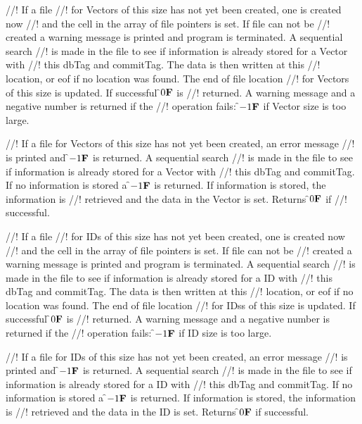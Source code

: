 //! If a file
//! for Vectors of this size has not yet been created, one is created now
//! and the cell in the array of file pointers is set. If file can not be
//! created a warning message is printed and program is terminated. A sequential search
//! is made in the file to see if information is already stored for a Vector with
//! this \p dbTag and \p commitTag. The data is then written at this
//! location, or eof if no location was found. The end of file location
//! for Vectors of this size is updated. If successful \f$0{\bf F}$ is
//! returned. A warning message and a negative number is returned if the
//! operation fails: \f$-1{\bf F}$ if Vector size is too large.

//! If a file for Vectors of this size has not yet been created, an error message
//! is printed and \f$-1{\bf F}$ is returned.  A sequential search
//! is made in the file to see if information is already stored for a Vector with
//! this \p dbTag and \p commitTag. If no information is stored a
\f$-1{\bf F}$ is returned. If information is stored, the information is
//! retrieved and the data in the Vector is set. Returns \f$0{\bf F}$ if
//! successful.

//! If a file
//! for IDs of this size has not yet been created, one is created now
//! and the cell in the array of file pointers is set. If file can not be
//! created a warning message is printed and program is terminated. A sequential search
//! is made in the file to see if information is already stored for a ID with
//! this \p dbTag and \p commitTag. The data is then written at this
//! location, or eof if no location was found. The end of file location
//! for IDss of this size is updated. If successful \f$0{\bf F}$ is
//! returned. A warning message and a negative number is returned if the
//! operation fails: \f$-1{\bf F}$ if ID size is too large.

//! If a file for IDs of this size has not yet been created, an error message
//! is printed and \f$-1{\bf F}$ is returned.  A sequential search
//! is made in the file to see if information is already stored for a ID with
//! this \p dbTag and \p commitTag. If no information is stored a
\f$-1{\bf F}$ is returned. If information is stored, the information is
//! retrieved and the data in the ID is set. Returns \f$0{\bf F}$ if successful. 

